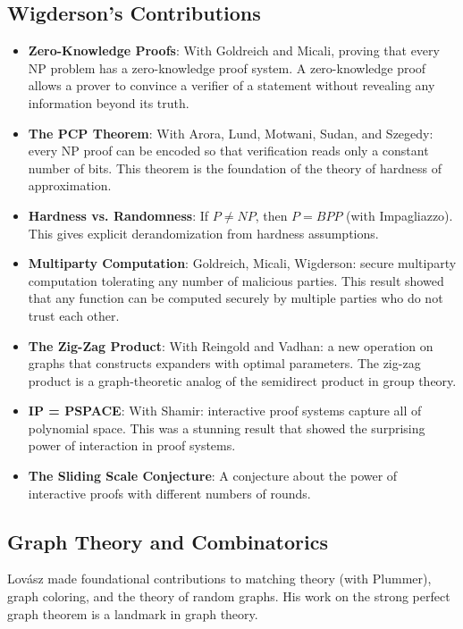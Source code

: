 \subsection{Wigderson's Contributions}

\begin{itemize}
\item \textbf{Zero-Knowledge Proofs}: With Goldreich and Micali, proving that every NP problem has a zero-knowledge proof system. A zero-knowledge proof allows a prover to convince a verifier of a statement without revealing any information beyond its truth.
\item \textbf{The PCP Theorem}: With Arora, Lund, Motwani, Sudan, and Szegedy: every NP proof can be encoded so that verification reads only a constant number of bits. This theorem is the foundation of the theory of hardness of approximation.
\item \textbf{Hardness vs. Randomness}: If $P \neq NP$, then $P = BPP$ (with Impagliazzo). This gives explicit derandomization from hardness assumptions.
\item \textbf{Multiparty Computation}: Goldreich, Micali, Wigderson: secure multiparty computation tolerating any number of malicious parties. This result showed that any function can be computed securely by multiple parties who do not trust each other.
\item \textbf{The Zig-Zag Product}: With Reingold and Vadhan: a new operation on graphs that constructs expanders with optimal parameters. The zig-zag product is a graph-theoretic analog of the semidirect product in group theory.
\item \textbf{IP = PSPACE}: With Shamir: interactive proof systems capture all of polynomial space. This was a stunning result that showed the surprising power of interaction in proof systems.
\item \textbf{The Sliding Scale Conjecture}: A conjecture about the power of interactive proofs with different numbers of rounds.
\end{itemize}

\subsection{Graph Theory and Combinatorics}

Lov\'asz made foundational contributions to matching theory (with Plummer), graph coloring, and the theory of random graphs. His work on the strong perfect graph theorem is a landmark in graph theory.

